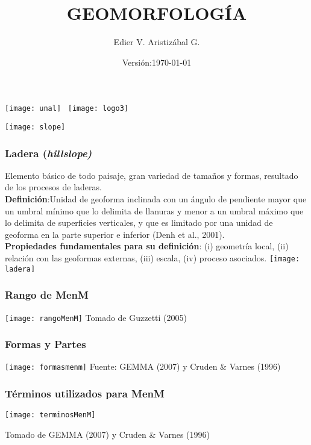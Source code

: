 \documentclass{beamer}
\title[Ambiente Denudacional: MenM]{GEOMORFOLOGÍA}
\author[Edier Aristizabal]{Edier V. Aristizábal G.}
\institute{evaristizabalg@unal.edu.co}
\date{\tiny{Versión:\today}}
\begin{document}
\begin{frame}
\titlepage
\centering
	\texttt{[image: unal]}\hspace*{4.75cm}~%
   	\texttt{[image: logo3]} 
\end{frame}
\begin{frame}
\centering
   	\texttt{[image: slope]} 
\end{frame}
\begin{frame}
\frametitle{Ladera (\it{hillslope})}
\small{Elemento básico de todo paisaje, gran variedad de tamaños y formas, resultado de los procesos de laderas.\\
\textbf{Definición}:Unidad de geoforma inclinada con un ángulo de pendiente mayor que un umbral mínimo que lo delimita de llanuras y menor a un umbral máximo que lo delimita de superficies verticales, y que es limitado por una unidad de geoforma en la parte superior e inferior (Denh et al., 2001).\\\textbf{Propiedades fundamentales para su definición}: (i) geometría local, (ii) relación con las geoformas externas, (iii) escala, (iv) proceso asociados.}
\centering
   	\texttt{[image: ladera]} 
\end{frame}
\begin{frame}
\frametitle{Rango de MenM}
\centering
   	\texttt{[image: rangoMenM]} 
\tiny{Tomado de Guzzetti (2005)}
\end{frame}
\begin{frame}
\frametitle{Formas y Partes}
\centering
   	\texttt{[image: formasmenm]} 
\tiny{Fuente: GEMMA (2007) y Cruden  \& Varnes (1996)}
\end{frame}
\begin{frame}
\frametitle{Términos utilizados para MenM}
\begin{center}
   	\texttt{[image: terminosMenM]} 
\end{center}
\tiny{Tomado de GEMMA (2007) y Cruden  \& Varnes (1996)}
\end{frame}
\end{document}
